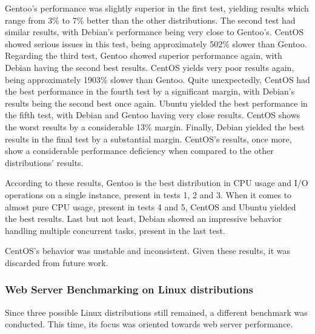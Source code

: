 Gentoo's performance was slightly superior in the first test, yielding results which range from 3\% to 7\% better than the other distributions. The second test had similar results, with Debian's performance being very close to Gentoo's. CentOS showed serious issues in this test, being approximately 502\% slower than Gentoo. Regarding the third test, Gentoo showed superior performance again, with Debian having the second best results. CentOS yields very poor results again, being approximately 1903\% slower than Gentoo. Quite unexpectedly, CentOS had the best performance in the fourth test by a significant margin, with Debian's results being the second best once again. Ubuntu yielded the best performance in the fifth test, with Debian and Gentoo having very close results. CentOS shows the worst results by a considerable 13\% margin. Finally, Debian yielded the best results in the final test by a substantial margin. CentOS's results, once more, show a considerable performance deficiency when compared to the other distributions' results.

According to these results, Gentoo is the best distribution in CPU usage and I/O operations on a single instance, present in tests 1, 2 and 3. When it comes to almost pure CPU usage, present in tests 4 and 5, CentOS and Ubuntu yielded the best results. Last but not least, Debian showed an impressive behavior handling multiple concurrent tasks, present in the last test.

CentOS's behavior was unstable and inconsistent. Given these results, it was discarded from future work.

\subsubsection{Web Server Benchmarking on Linux distributions}
Since three possible Linux distributions still remained, a different benchmark was conducted. This time, its focus was oriented towards web server performance.


